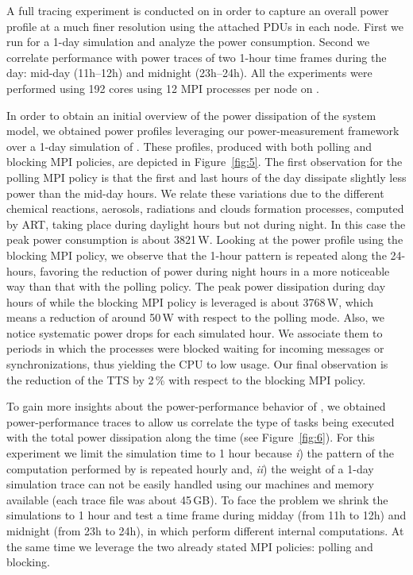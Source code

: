 A full tracing  experiment is conducted on \tinto  in order to capture
an overall power profile at a much finer resolution using the attached
PDUs in each  node. First we run \cosmoart for  a 1-day simulation and
analyze the  power consumption.  Second we correlate  performance with
power  traces  of two  1-hour  time  frames  during the  day:  mid-day
(11h--12h) and midnight (23h--24h). All the experiments were performed
using 192 cores using 12 MPI processes per node on \tinto.

In order to obtain an initial overview of the power dissipation of the
system  model,  we  obtained  power  profiles  leveraging  our  \pmlib
power-measurement    framework   over    a    1-day   simulation    of
\cosmoart. These profiles, produced with both polling and blocking MPI
policies,  are depicted in  Figure~\ref{fig:5}. The  first observation
for the polling MPI policy is that the first and last hours of the day
dissipate slightly less power than  the mid-day hours. We relate these
variations  due   to  the  different   chemical  reactions,  aerosols,
radiations  and clouds  formation processes,  computed by  ART, taking
place during  daylight hours  but not during  night. In this  case the
peak power consumption is about  3821\,W. Looking at the power profile
using the blocking  MPI policy, we observe that  the 1-hour pattern is
repeated along  the 24-hours, favoring  the reduction of  power during
night  hours in  a  more noticeable  way  than that  with the  polling
policy.  The peak  power dissipation  during  day hours  of while  the
blocking  MPI policy  is leveraged  is  about 3768\,W,  which means  a
reduction of around  50\,W with respect to the  polling mode. Also, we
notice systematic  power drops for  each simulated hour.  We associate
them  to periods  in  which  the processes  were  blocked waiting  for
incoming messages  or synchronizations, thus  yielding the CPU  to low
usage. Our final observation is the reduction of the TTS by 2\,\% with
respect to the blocking MPI policy.

To  gain  more  insights   about  the  power-performance  behavior  of
\cosmoart,  we  obtained power-per\-for\-man\-ce  traces  to allow  us
correlate  the type  of  tasks  being executed  with  the total  power
dissipation  along  the   time  (see  Figure~\ref{fig:6}).   For  this
experiment we  limit the simulation  time to 1 hour  because \emph{i})
the  pattern of  the computation  performed by  \cosmoart  is repeated
hourly and, \emph{ii}) the weight  of a 1-day simulation trace can not
be easily handled using our  machines and memory available (each trace
file was about 45\,GB). To  face the problem we shrink the simulations
to 1 hour  and test a time  frame during midday (from 11h  to 12h) and
midnight  (from 23h  to  24h), in  which  \cosmoart perform  different
internal computations.  At  the same time we leverage  the two already
stated MPI policies: polling and blocking.


